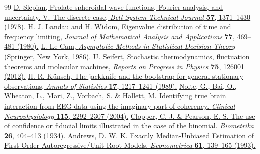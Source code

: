 \begin{thebibliography}{99}
 \href{https://doi.org/10.1002/j.1538-7305.1978.tb02104.x}{D. Slepian, Prolate spheroidal wave functions, Fourier analysis, and uncertainty. V. The discrete case, \emph{Bell System Technical Journal} \textbf{57}, 1371--1430 (1978).}
 \href{https://doi.org/10.1016/0022-247X(80)90241-3}{H. J. Landau and H. Widom, Eigenvalue distribution of time and frequency limiting, \emph{Journal of Mathematical Analysis and Applications} \textbf{77}, 469--481 (1980).}
 \href{https://doi.org/10.1007/978-1-4612-4946-7}{L. Le Cam, \emph{Asymptotic Methods in Statistical Decision Theory} (Springer, New York, 1986).}
 \href{https://doi.org/10.1088/0034-4885/75/12/126001}{U. Seifert, Stochastic thermodynamics, fluctuation theorems and molecular machines, \emph{Reports on Progress in Physics} \textbf{75}, 126001 (2012).}
 \href{https://doi.org/10.1214/aos/1176347265}{H. R. K\"unsch, The jackknife and the bootstrap for general stationary observations, \emph{Annals of Statistics} \textbf{17}, 1217--1241 (1989).}
 \href{https://doi.org/10.1016/j.clinph.2004.04.029}{Nolte, G., Bai, O., Wheaton, L., Mari, Z., Vorbach, S. \& Hallett, M.
Identifying true brain interaction from EEG data using the imaginary part of coherency.
\emph{Clinical Neurophysiology} \textbf{115}, 2292--2307 (2004).}
 \href{https://doi.org/10.1093/biomet/26.4.404}{Clopper, C. J. \& Pearson, E. S. The use of confidence or fiducial limits illustrated in the case of the binomial. \emph{Biometrika} \textbf{26}, 404--413 (1934).}
 \href{https://doi.org/10.2307/2951781}{Andrews, D. W. K. Exactly Median-Unbiased Estimation of First Order Autoregressive/Unit Root Models. \emph{Econometrica} \textbf{61}, 139--165 (1993).}
\end{thebibliography}
